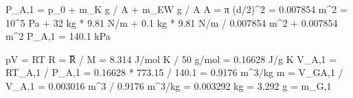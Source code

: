 P_A,1 = p_0 + m_K g / A + m_EW g / A  
A = π (d/2)^2 = 0.007854 m^2  
= 10^5 Pa + 32 kg * 9.81 N/m + 0.1 kg * 9.81 N/m  
/ 0.007854 m^2 + 0.007854 m^2  
P_A,1 = 140.1 kPa  

pV = RT  
R = R̅ / M = 8.314 J/mol K / 50 g/mol = 0.16628 J/g K  
V_A,1 = RT_A,1 / P_A,1 = 0.16628 * 773.15 / 140.1 = 0.9176 m^3/kg  
m = V_GA,1 / V_A,1 = 0.003016 m^3 / 0.9176 m^3/kg = 0.003292 kg = 3.292 g = m_G,1